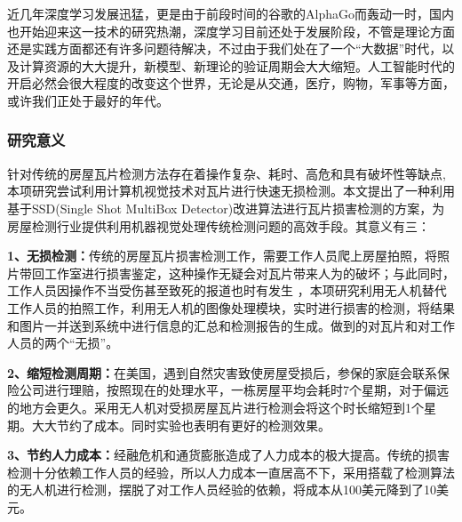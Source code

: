 近几年深度学习发展迅猛，更是由于前段时间的谷歌的AlphaGo而轰动一时，国内也开始迎来这一技术的研究热潮，深度学习目前还处于发展阶段，不管是理论方面还是实践方面都还有许多问题待解决，不过由于我们处在了一个“大数据”时代，以及计算资源的大大提升，新模型、新理论的验证周期会大大缩短。人工智能时代的开启必然会很大程度的改变这个世界，无论是从交通，医疗，购物，军事等方面，或许我们正处于最好的年代。

\subsubsection{研究意义}
针对传统的房屋瓦片检测方法存在着操作复杂、耗时、高危和具有破坏性等缺点,本项研究尝试利用计算机视觉技术对瓦片进行快速无损检测。本文提出了一种利用基于SSD(Single Shot MultiBox Detector)\cite{ssd}改进算法进行瓦片损害检测的方案，为房屋检测行业提供利用机器视觉处理传统检测问题的高效手段。其意义有三：

\textbf{1、无损检测：}传统的房屋瓦片损害检测工作，需要工作人员爬上房屋拍照，将照片带回工作室进行损害鉴定，这种操作无疑会对瓦片带来人为的破坏；与此同时，工作人员因操作不当受伤甚至致死的报道也时有发生 ，本项研究利用无人机替代工作人员的拍照工作，利用无人机的图像处理模块，实时进行损害的检测，将结果和图片一并送到系统中进行信息的汇总和检测报告的生成。做到的对瓦片和对工作人员的两个“无损”。

\textbf{2、缩短检测周期：}在美国，遇到自然灾害致使房屋受损后，参保的家庭会联系保险公司进行理赔，按照现在的处理水平，一栋房屋平均会耗时7个星期，对于偏远的地方会更久。采用无人机对受损房屋瓦片进行检测会将这个时长缩短到1个星期。大大节约了成本。同时实验也表明有更好的检测效果。

\textbf{3、节约人力成本：}经融危机和通货膨胀造成了人力成本的极大提高。传统的损害检测十分依赖工作人员的经验，所以人力成本一直居高不下，采用搭载了检测算法的无人机进行检测，摆脱了对工作人员经验的依赖，将成本从100美元降到了10美元。